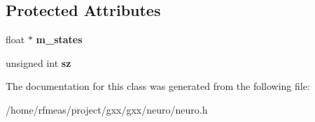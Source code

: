 \subsection*{Protected Attributes}
\begin{DoxyCompactItemize}
\item 
float $\ast$ {\bfseries m\+\_\+states}\hypertarget{classgxx_1_1neuro_1_1layer_a312e28d1678b384718cb58185e253b3c}{}\label{classgxx_1_1neuro_1_1layer_a312e28d1678b384718cb58185e253b3c}

\item 
unsigned int {\bfseries sz}\hypertarget{classgxx_1_1neuro_1_1layer_a20dd0dcda743314191e3ef3d87a7ba0d}{}\label{classgxx_1_1neuro_1_1layer_a20dd0dcda743314191e3ef3d87a7ba0d}

\end{DoxyCompactItemize}


The documentation for this class was generated from the following file\+:\begin{DoxyCompactItemize}
\item 
/home/rfmeas/project/gxx/gxx/neuro/neuro.\+h\end{DoxyCompactItemize}
